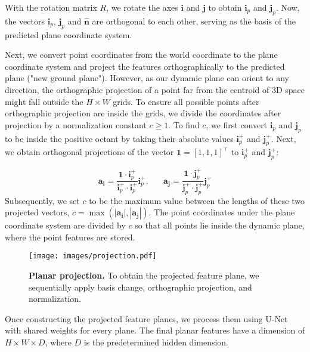 \documentclass[10pt,twocolumn,letterpaper]{article}
\begin{document}
With the rotation matrix $R$, we rotate the axes $\mathbf{i}$ and $\mathbf{j}$ to obtain $\mathbf{i}_{p}$ and $\mathbf{j}_{p}$. Now, the vectors $\mathbf{i}_{p}$, $\mathbf{j}_{p}$ and $\hat{\mathbf{n}}$ are orthogonal to each other, serving as the basis of the predicted plane coordinate system.

Next, we convert point coordinates from the world coordinate to the plane coordinate system and project the features orthographically to the predicted plane ("new ground plane"). 
However, as our dynamic plane can orient to any direction, the orthographic projection of a point far from the centroid of 3D space might fall outside the $H \times W$ grids. To ensure all possible points after orthographic projection are inside the grids, we divide the coordinates after projection by a normalization constant $c \geq 1$. To find $c$, we first convert $\mathbf{i}_{p}$ and $\mathbf{j}_{p}$ to be inside the positive octant by taking their absolute values $\mathbf{i}^+_{p}$ and $\mathbf{j}^+_{p}$. Next, we obtain orthogonal projections of the vector $\mathbf{1} = [1,1,1]^\top$ to $\mathbf{i}^+_{p}$ and $\mathbf{j}^+_{p}$:

\begin{equation}
\mathbf{a}_{\mathbf{i}} =  \frac{\mathbf{1}\cdot\mathbf{i}^+_{p}}{\mathbf{i}^+_{p} \cdot\mathbf{i}^+_{p}}\mathbf{i}^+_{p}, \;\;\;\;\;\;
\mathbf{a}_{\mathbf{j}} = \frac{\mathbf{1}\cdot\mathbf{j}^+_{p}}{\mathbf{j}^+_{p} \cdot\mathbf{j}^+_{p}}\mathbf{j}^+_{p}
\end{equation}
Subsequently, we set $c$ to be the maximum value between the lengths of these two projected vectors, $c =\max(|\mathbf{a}_{\mathbf{i}}|, |\mathbf{a}_{\mathbf{j}}|)$.
The point coordinates under the plane coordinate system are divided by $c$ so that all points lie inside the dynamic plane, where the point features are stored.


\begin{figure}[!t]
\centering
\texttt{[image: images/projection.pdf]}
\caption{\textbf{Planar projection.} To obtain the projected feature plane, we sequentially apply basis change, orthographic projection, and normalization.}
\label{fig:projection}
\end{figure}

Once constructing the projected feature planes, we process them using U-Net \cite{unet} with shared weights for every plane. The final planar features have a dimension of $H \times W \times D$, where $D$ is the predetermined hidden dimension. 
\end{document}
